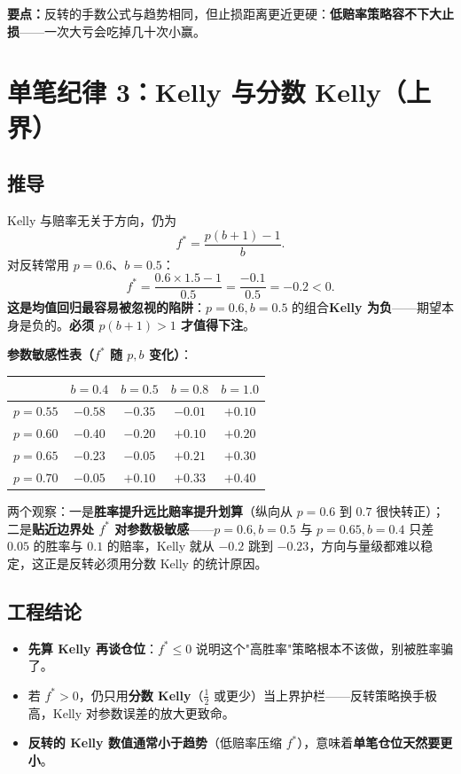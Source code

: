 \documentclass[UTF8,11pt]{ctexart}
\newcommand{\takeaway}[1]{\medskip\par\noindent\textbf{要点：}#1\par\medskip}
\begin{document}
\takeaway{反转的手数公式与趋势相同，但止损距离更近更硬：\textbf{低赔率策略容不下大止损}——一次大亏会吃掉几十次小赢。}

\section{单笔纪律 3：Kelly 与分数 Kelly（上界）}
\subsection{推导}
Kelly 与赔率无关于方向，仍为
\begin{equation}
f^{*}=\frac{p(b+1)-1}{b}.
\end{equation}
对反转常用 $p=0.6$、$b=0.5$：
\begin{equation}
f^{*}=\frac{0.6\times1.5-1}{0.5}=\frac{-0.1}{0.5}=-0.2 < 0.
\end{equation}
\textbf{这是均值回归最容易被忽视的陷阱}：$p=0.6,b=0.5$ 的组合\textbf{Kelly 为负}——期望本身是负的。\textbf{必须 $p(b+1)>1$ 才值得下注}。

\textbf{参数敏感性表（$f^{*}$ 随 $p,b$ 变化）}：
\begin{center}
\setlength{\tabcolsep}{6pt}
\renewcommand{\arraystretch}{1.3}
\begin{tabular}{@{}ccccc@{}}
\toprule
 & $b=0.4$ & $b=0.5$ & $b=0.8$ & $b=1.0$ \\
\midrule
$p=0.55$ & $-0.58$ & $-0.35$ & $-0.01$ & $+0.10$ \\
$p=0.60$ & $-0.40$ & $-0.20$ & $+0.10$ & $+0.20$ \\
$p=0.65$ & $-0.23$ & $-0.05$ & $+0.21$ & $+0.30$ \\
$p=0.70$ & $-0.05$ & $+0.10$ & $+0.33$ & $+0.40$ \\
\bottomrule
\end{tabular}
\end{center}
两个观察：一是\textbf{胜率提升远比赔率提升划算}（纵向从 $p=0.6$ 到 $0.7$ 很快转正）；二是\textbf{贴近边界处 $f^{*}$ 对参数极敏感}——$p=0.6,b=0.5$ 与 $p=0.65,b=0.4$ 只差 $0.05$ 的胜率与 $0.1$ 的赔率，Kelly 就从 $-0.2$ 跳到 $-0.23$，方向与量级都难以稳定，这正是反转必须用分数 Kelly 的统计原因。
\subsection{工程结论}
\begin{itemize}[itemsep=2pt]
\item \textbf{先算 Kelly 再谈仓位}：$f^{*}\le0$ 说明这个"高胜率"策略根本不该做，别被胜率骗了。
\item 若 $f^{*}>0$，仍只用\textbf{分数 Kelly}（$\tfrac12$ 或更少）当上界护栏——反转策略换手极高，Kelly 对参数误差的放大更致命。
\item \textbf{反转的 Kelly 数值通常小于趋势}（低赔率压缩 $f^{*}$），意味着\textbf{单笔仓位天然要更小}。
\end{itemize}
\end{document}
